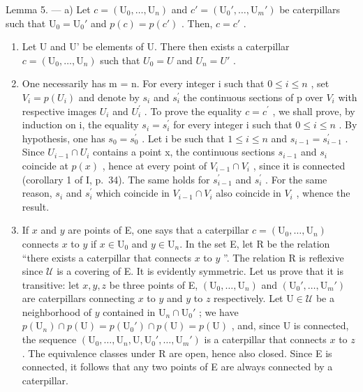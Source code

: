 Lemma 5. --- a) Let \(c = (\mathrm{U}_0, \ldots, \mathrm{U}_n)\) and \(c' = (\mathrm{U}_0', \ldots, \mathrm{U}_m')\) be caterpillars such that \(\mathrm{U}_0 = \mathrm{U}_0'\) and \(p(c) = p(c')\) . Then, \(c = c'\) .

\begin{enumerate}
\def\labelenumi{\alph{enumi})}
\setcounter{enumi}{1}
\item
  Let U and U' be elements of U. There then exists a caterpillar \(c = (\mathrm{U}_{0}, \ldots, \mathrm{U}_{n})\) such that \(U_{0} = U\) and \(U_{n} = U'\) .
\item
  One necessarily has m = n. For every integer i such that \(0 \leqslant i \leqslant n\) , set \(V_{i} = p(U_{i})\) and denote by \(s_{i}\) and \(s_{i}^{\prime}\) the continuous sections of p over \(V_{i}\) with respective images \(U_{i}\) and \(U_{i}^{\prime}\) . To prove the equality \(c = c^{\prime}\) , we shall prove, by induction on i, the equality \(s_{i} = s_{i}^{\prime}\) for every integer i such that \(0 \leqslant i \leqslant n\) . By hypothesis, one has \(s_{0} = s_{0}^{\prime}\) . Let i be such that \(1 \leqslant i \leqslant n\) and \(s_{i-1} = s_{i-1}^{\prime}\) . Since \(U_{i-1} \cap U_{i}\) contains a point x, the continuous sections \(s_{i-1}\) and \(s_{i}\) coincide at \(p(x)\) , hence at every point of \(V_{i-1} \cap V_{i}\) , since it is connected (corollary 1 of I, p.~34). The same holds for \(s_{i-1}^{\prime}\) and \(s_{i}^{\prime}\) . For the same reason, \(s_{i}\) and \(s_{i}^{\prime}\) which coincide in \(V_{i-1} \cap V_{i}\) also coincide in \(V_{i}\) , whence the result.
\item
  If \(x\) and \(y\) are points of E, one says that a caterpillar \(c = (\mathrm{U}_0, \ldots, \mathrm{U}_n)\) connects \(x\) to \(y\) if \(x \in \mathrm{U}_0\) and \(y \in \mathrm{U}_n\). In the set E, let R be the relation “there exists a caterpillar that connects \(x\) to \(y\) ”. The relation R is reflexive since \(\mathcal{U}\) is a covering of E. It is evidently symmetric. Let us prove that it is transitive: let \(x, y, z\) be three points of E, \((\mathrm{U}_0, \ldots, \mathrm{U}_n)\) and \((\mathrm{U}_0', \ldots, \mathrm{U}_m')\) are caterpillars connecting \(x\) to \(y\) and \(y\) to \(z\) respectively. Let \(\mathrm{U} \in \mathcal{U}\) be a neighborhood of \(y\) contained in \(\mathrm{U}_n \cap \mathrm{U}_0'\) ; we have \(p(\mathrm{U}_n) \cap p(\mathrm{U}) = p(\mathrm{U}_0') \cap p(\mathrm{U}) = p(\mathrm{U})\) , and, since U is connected, the sequence \((\mathrm{U}_0, \ldots, \mathrm{U}_n, \mathrm{U}, \mathrm{U}_0', \ldots, \mathrm{U}_m')\) is a caterpillar that connects \(x\) to \(z\) . The equivalence classes under R are open, hence also closed. Since E is connected, it follows that any two points of E are always connected by a caterpillar.
\end{enumerate}

